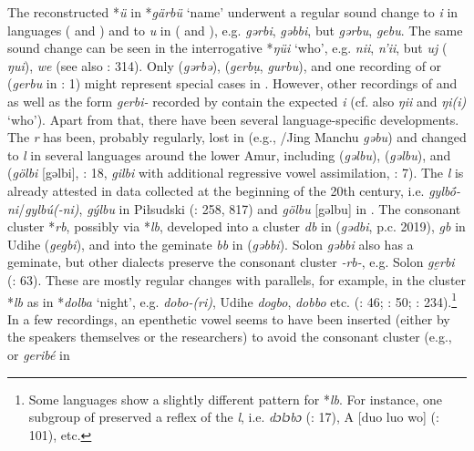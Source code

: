 \documentclass[output=paper,colorlinks,citecolor=brown]{langscibook}
\begin{document}
The reconstructed *\textit{ü} in *\textit{gärbü} ‘name’ underwent a regular sound change to \textit{i} in  languages ( and ) and to \textit{u} in  ( and ), e.g.  \textit{gərbi},  \textit{gəbbi}, but  \textit{gərbu},  \textit{gebu}. The same sound change can be seen in the interrogative *\textit{ŋüi} ‘who’, e.g.  \textit{nii},  \textit{n’ii}, but  \textit{uj} ( \textit{ŋui}),  \textit{we} (see also \citealt{Hölzl2018a}: 314). Only  (\textit{gərbə}),  (\textit{gerbụ}, \textit{gurbu}), and one recording of  or  (\textit{gerbu} in \citealt{Ivanovskiy1982}: 1) might represent special cases in . However, other recordings of  and  as well as the  form \textit{gerbi-} recorded by \citet[169]{Pallas1786} contain the expected \textit{i} (cf. also  \textit{ŋii} and  \textit{ŋi(i)} ‘who’). Apart from that, there have been several language-specific developments. The \textit{r} has been, probably regularly, lost in  (e.g., /Jing Manchu \textit{gəbu}) and changed to \textit{l} in several languages around the lower Amur, including  (\textit{gəlbu}),  (\textit{gəlbu}), and  (\textit{gölbi} [gəlbi], \citealt{Schmidt1923a}: 18, \textit{gilbi} with additional regressive vowel assimilation, \citealt{KhasanovaPevnov2003}: 7). The \textit{l} is already attested in data collected at the beginning of the 20th century, i.e.  \textit{gylbṓ-ni}/\textit{gylbú(-ni)},  \textit{gýlbu} in Piłsudski (\citealt{Majewicz2011}: 258, 817) and  \textit{gölbu} [gəlbu] in \citet[251]{Schmidt1923b}. The consonant cluster *\textit{rb}, possibly via *\textit{lb}, developed into a cluster \textit{db} in  (\textit{gədbi},  p.c. 2019), \textit{gb} in  Udihe (\textit{gegbi}), and into the geminate \textit{bb} in  (\textit{gəbbi}).  Solon \textit{gəbbi} also has a geminate, but other  dialects preserve the consonant cluster \textit{-rb-}, e.g.  Solon \textit{ge̮rbi} (\citealt{Aalto1977}: 63). These are mostly regular changes with parallels, for example, in the cluster *\textit{lb} as in  *\textit{dolba} ‘night’, e.g.  \textit{dobo-(ri)},  Udihe \textit{dogbo},  \textit{dobbo} etc. (\citealt{Benzing1956}: 46; \citealt{Kazama2003}: 50; \citealt{Doerferetal2004}: 234).\footnote{Some languages show a slightly different pattern for *\textit{lb}. For instance, one subgroup of  preserved a reflex of the \textit{l}, i.e.  \textit{dɔlɔbɔ} (\citealt{MuYejun1987H}: 17),  A  [duo luo wo] (\citealt{Kiyose1977}: 101), etc.} In a few recordings, an epenthetic vowel seems to have been inserted (either by the speakers themselves or the researchers) to avoid the consonant cluster (e.g.,  or  \textit{geribé} in 
\end{document}
